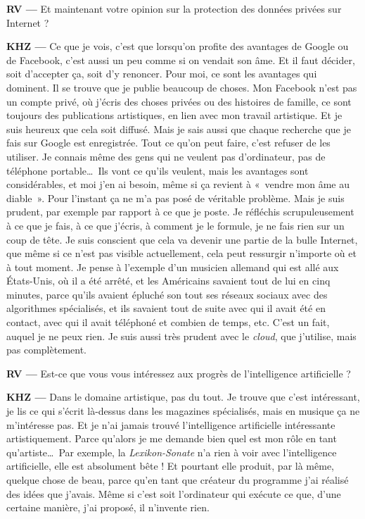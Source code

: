 \documentclass[a4paper,12pt]{article}
\newcommand{\guill}[1]{«~#1~»}
\begin{document}
\textbf{RV ---} Et maintenant votre opinion sur la protection des données privées sur Internet ?

\textbf{KHZ ---} Ce que je vois, c'est que lorsqu'on profite des avantages de Google ou de Facebook, c'est aussi un peu comme si on vendait son âme. Et il faut décider, soit d'accepter ça, soit d'y renoncer. Pour moi, ce sont les avantages qui dominent. Il se trouve que je publie beaucoup de choses. Mon Facebook n'est pas un compte privé, où j'écris des choses privées ou des histoires de famille, ce sont toujours des publications artistiques, en lien avec mon travail artistique. Et je suis heureux que cela soit diffusé. Mais je sais aussi que chaque recherche que je fais sur Google est enregistrée. Tout ce qu'on peut faire, c'est refuser de les utiliser. Je connais même des gens qui ne veulent pas d'ordinateur, pas de téléphone portable\dots~Ils vont ce qu'ils veulent, mais les avantages sont considérables, et moi j'en ai besoin, même si ça revient à \guill{vendre mon âme au diable}. Pour l'instant ça ne m'a pas posé de véritable problème. Mais je suis prudent, par exemple par rapport à ce que je poste. Je réfléchis scrupuleusement à ce que je fais, à ce que j'écris, à comment je le formule, je ne fais rien sur un coup de tête. Je suis conscient que cela va devenir une partie de la bulle Internet, que même si ce n'est pas visible actuellement, cela peut ressurgir n'importe où et à tout moment. Je pense à l'exemple d'un musicien allemand qui est allé aux États-Unis, où il a été arrêté, et les Américains savaient tout de lui en cinq minutes, parce qu'ils avaient épluché son tout ses réseaux sociaux avec des algorithmes spécialisés, et ils savaient tout de suite avec qui il avait été en contact, avec qui il avait téléphoné et combien de temps, etc. C'est un fait, auquel je ne peux rien. Je suis aussi très prudent avec le \emph{cloud}, que j'utilise, mais pas complètement.

\textbf{RV ---} Est-ce que vous vous intéressez aux progrès de l'intelligence artificielle ?

\textbf{KHZ ---} Dans le domaine artistique, pas du tout. Je trouve que c'est intéressant, je lis ce qui s'écrit là-dessus dans les magazines spécialisés, mais en musique ça ne m'intéresse pas. Et je n'ai jamais trouvé l'intelligence artificielle intéressante artistiquement. Parce qu'alors je me demande bien quel est mon rôle en tant qu'artiste\dots~Par exemple, la \emph{Lexikon-Sonate} n'a rien à voir avec l'intelligence artificielle, elle est absolument bête ! Et pourtant elle produit, par là même, quelque chose de beau, parce qu'en tant que créateur du programme j'ai réalisé des idées que j'avais. Même si c'est soit l'ordinateur qui exécute ce que, d'une certaine manière, j'ai proposé, il n'invente rien.
\end{document}
